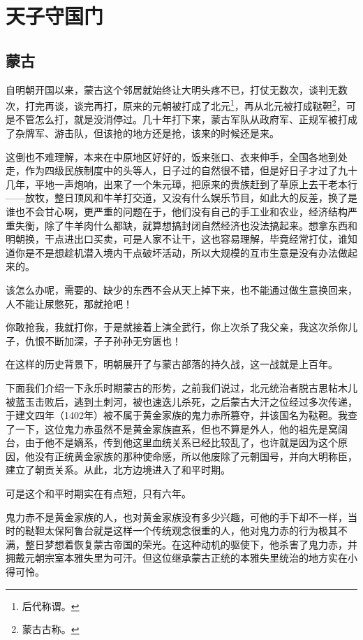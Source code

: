 \section{天子守国门}
\ifnum{}
	\begin{multicols}{\theparacolNo}
\fi
\subsection{蒙古}
自明朝开国以来，蒙古这个邻居就始终让大明头疼不已，打仗无数次，谈判无数次，打完再谈，谈完再打，原来的元朝被打成了北元\footnote{后代称谓。}，再从北元被打成鞑靼\footnote{蒙古古称。}，可是不管怎么打，就是没消停过。几十年打下来，蒙古军队从政府军、正规军被打成了杂牌军、游击队，但该抢的地方还是抢，该来的时候还是来。

这倒也不难理解，本来在中原地区好好的，饭来张口、衣来伸手，全国各地到处走，作为四级民族制度中的头等人，日子过的自然很不错，但是好日子才过了九十几年，平地一声炮响，出来了一个朱元璋，把原来的贵族赶到了草原上去干老本行——放牧，整日顶风和牛羊打交道，又没有什么娱乐节目，如此大的反差，换了是谁也不会甘心啊，更严重的问题在于，他们没有自己的手工业和农业，经济结构严重失衡，除了牛羊肉什么都缺，就算想搞封闭自然经济也没法搞起来。想拿东西和明朝换，干点进出口买卖，可是人家不让干，这也容易理解，毕竟经常打仗，谁知道你是不是想趁机潜入境内干点破坏活动，所以大规模的互市生意是没有办法做起来的。

该怎么办呢，需要的、缺少的东西不会从天上掉下来，也不能通过做生意换回来，人不能让尿憋死，那就抢吧！

你敢抢我，我就打你，于是就接着上演全武行，你上次杀了我父亲，我这次杀你儿子，仇恨不断加深，子子孙孙无穷匮也！

在这样的历史背景下，明朝展开了与蒙古部落的持久战，这一战就是上百年。

下面我们介绍一下永乐时期蒙古的形势，之前我们说过，北元统治者脱古思帖木儿被蓝玉击败后，逃到土刺河，被也速迭儿杀死，之后蒙古大汗之位经过多次传递，于建文四年（1402年）被不属于黄金家族的鬼力赤所篡夺，并该国名为鞑靼。我查了一下，这位鬼力赤虽然不是黄金家族直系，但也不算是外人，他的祖先是窝阔台，由于他不是嫡系，传到他这里血统关系已经比较乱了，也许就是因为这个原因，他没有正统黄金家族的那种使命感，所以他废除了元朝国号，并向大明称臣，建立了朝贡关系。从此，北方边境进入了和平时期。

可是这个和平时期实在有点短，只有六年。

鬼力赤不是黄金家族的人，也对黄金家族没有多少兴趣，可他的手下却不一样，当时的鞑靼太保阿鲁台就是这样一个传统观念很重的人，他对鬼力赤的行为极其不满，整日梦想着恢复蒙古帝国的荣光。在这种动机的驱使下，他杀害了鬼力赤，并拥戴元朝宗室本雅失里为可汗。但这位继承蒙古正统的本雅失里统治的地方实在小得可怜。


\end{multicols}
